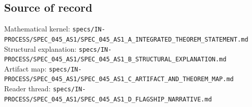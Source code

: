 \documentclass[11pt]{article}
\theoremstyle{plain}
\theoremstyle{definition}
\newcommand{\lean}[1]{\texttt{\small #1}}
\begin{document}
\subsection*{Source of record}

Mathematical kernel: \lean{specs/IN-PROCESS/SPEC\_045\_AS1/SPEC\_045\_AS1\_A\_INTEGRATED\_THEOREM\_STATEMENT.md}\\
Structural explanation: \lean{specs/IN-PROCESS/SPEC\_045\_AS1/SPEC\_045\_AS1\_B\_STRUCTURAL\_EXPLANATION.md}\\
Artifact map: \lean{specs/IN-PROCESS/SPEC\_045\_AS1/SPEC\_045\_AS1\_C\_ARTIFACT\_AND\_THEOREM\_MAP.md}\\
Reader thread: \lean{specs/IN-PROCESS/SPEC\_045\_AS1/SPEC\_045\_AS1\_D\_FLAGSHIP\_NARRATIVE.md}
\end{document}
